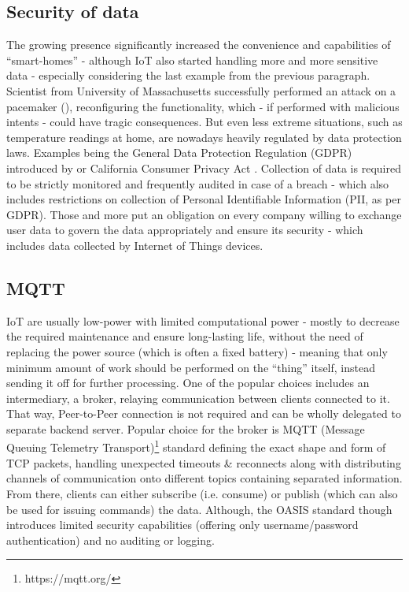 \subsection{Security of data}
The growing presence significantly increased the convenience and capabilities of ``smart-homes'' - although IoT also started handling more and more sensitive data - especially considering the last example from the previous paragraph. Scientist from University of Massachusetts successfully performed an attack on a pacemaker (\citeauthor{4531149}), reconfiguring the functionality, which - if performed with malicious intents - could have tragic consequences. But even less extreme situations, such as temperature readings at home, are nowadays heavily regulated by data protection laws. Examples being the General Data Protection Regulation (GDPR) introduced by \citet{EUdataregulations2018} or California Consumer Privacy Act \citep{CCPA}. Collection of data is required to be strictly monitored and frequently audited in case of a breach - which also includes restrictions on collection of Personal Identifiable Information (PII, as per GDPR). Those and more put an obligation on every company willing to exchange user data to govern the data appropriately and ensure its security - which includes data collected by Internet of Things devices.

\subsection{MQTT}
IoT are usually low-power with limited computational power - mostly to decrease the required maintenance and ensure long-lasting life, without the need of replacing the power source (which is often a fixed battery) - meaning that only minimum amount of work should be performed on the ``thing'' itself, instead sending it off for further processing. One of the popular choices includes an intermediary, a broker, relaying communication between clients connected to it. That way, Peer-to-Peer connection is not required and can be wholly delegated to separate backend server. Popular choice for the broker is MQTT (Message Queuing Telemetry Transport)\footnote{https://mqtt.org/} standard defining the exact shape and form of TCP packets, handling unexpected timeouts \& reconnects along with distributing channels of communication onto different topics containing separated information. From there, clients can either subscribe (i.e. consume) or publish (which can also be used for issuing commands) the data. Although, the OASIS standard though introduces limited security capabilities (offering only username/password authentication) and no auditing or logging.

